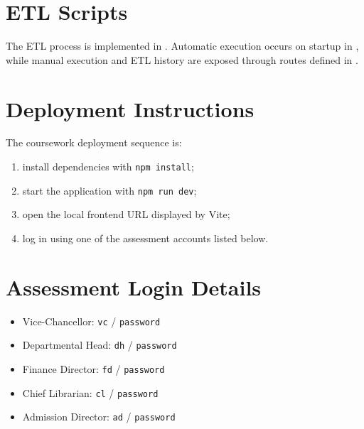 \documentclass[12pt,a4paper]{article}
\begin{document}
\section{ETL Scripts}
The ETL process is implemented in . Automatic execution occurs on startup in , while manual execution and ETL history are exposed through routes defined in .

\section{Deployment Instructions}
The coursework deployment sequence is:
\begin{enumerate}
  \item install dependencies with \texttt{npm install};
  \item start the application with \texttt{npm run dev};
  \item open the local frontend URL displayed by Vite;
  \item log in using one of the assessment accounts listed below.
\end{enumerate}

\section{Assessment Login Details}
\begin{itemize}
  \item Vice-Chancellor: \texttt{vc} / \texttt{password}
  \item Departmental Head: \texttt{dh} / \texttt{password}
  \item Finance Director: \texttt{fd} / \texttt{password}
  \item Chief Librarian: \texttt{cl} / \texttt{password}
  \item Admission Director: \texttt{ad} / \texttt{password}
\end{itemize}
\end{document}
